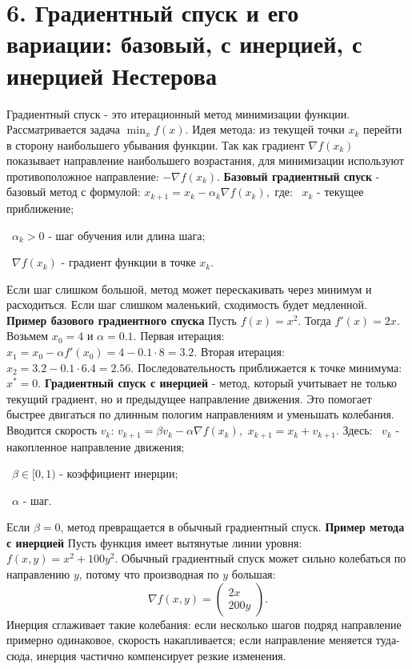 \documentclass[12pt,a4paper]{article}
\begin{document}
\section{6. Градиентный спуск и его вариации: базовый, с инерцией, с инерцией Нестерова}
Градиентный спуск - это итерационный метод минимизации функции. Рассматривается задача $\min_x f(x).$
Идея метода: из текущей точки $x_k$ перейти в сторону наибольшего убывания функции. Так как градиент $\nabla f(x_k)$ показывает направление наибольшего возрастания, для минимизации используют противоположное направление: $-\nabla f(x_k).$
\textbf{Базовый градиентный спуск} - базовый метод с формулой: $x_{k+1}=x_k-\alpha_k \nabla f(x_k),$
где:
\noindent\textbullet\ $x_k$ - текущее приближение;\par
\noindent\textbullet\ $\alpha_k>0$ - шаг обучения или длина шага;\par
\noindent\textbullet\ $\nabla f(x_k)$ - градиент функции в точке $x_k$.\par
Если шаг слишком большой, метод может перескакивать через минимум и расходиться. Если шаг слишком маленький, сходимость будет медленной.
\textbf{Пример базового градиентного спуска}
Пусть $f(x)=x^2.$
Тогда $f'(x)=2x.$
Возьмем $x_0=4$ и $\alpha=0.1$.
Первая итерация: $x_1=x_0-\alpha f'(x_0)=4-0.1\cdot 8=3.2.$
Вторая итерация: $x_2=3.2-0.1\cdot 6.4=2.56.$
Последовательность приближается к точке минимума: $x^*=0.$
\textbf{Градиентный спуск с инерцией} - метод, который учитывает не только текущий градиент, но и предыдущее направление движения. Это помогает быстрее двигаться по длинным пологим направлениям и уменьшать колебания.
Вводится скорость $v_k$: $v_{k+1}=\beta v_k-\alpha \nabla f(x_k),$ $x_{k+1}=x_k+v_{k+1}.$
Здесь:
\noindent\textbullet\ $v_k$ - накопленное направление движения;\par
\noindent\textbullet\ $\beta \in [0,1)$ - коэффициент инерции;\par
\noindent\textbullet\ $\alpha$ - шаг.\par
Если $\beta=0$, метод превращается в обычный градиентный спуск.
\textbf{Пример метода с инерцией}
Пусть функция имеет вытянутые линии уровня: $f(x,y)=x^2+100y^2.$
Обычный градиентный спуск может сильно колебаться по направлению $y$, потому что производная по $y$ большая:
\[
\nabla f(x,y)=
\begin{pmatrix}
2x\\
200y
\end{pmatrix}.
\]
Инерция сглаживает такие колебания: если несколько шагов подряд направление примерно одинаковое, скорость накапливается; если направление меняется туда-сюда, инерция частично компенсирует резкие изменения.
\end{document}
